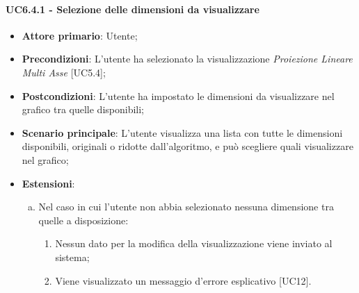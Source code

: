 \paragraph{UC6.4.1 - Selezione delle dimensioni da visualizzare}
\begin{itemize}
	\item \textbf{Attore primario}: Utente;
	\item \textbf{Precondizioni}: L'utente ha selezionato la visualizzazione \textit{Proiezione Lineare Multi Asse} [UC5.4];
	\item \textbf{Postcondizioni}: L'utente ha impostato le dimensioni da visualizzare nel grafico tra quelle disponibili;
	
	\item \textbf{Scenario principale}: L'utente visualizza una lista con tutte le dimensioni disponibili, originali o ridotte dall'algoritmo, e può scegliere quali visualizzare nel grafico;
	
	\item \textbf{Estensioni}:
	\begin{enumerate}[(a)]
		\item Nel caso in cui l'utente non abbia selezionato nessuna dimensione tra quelle a disposizione:
		\begin{enumerate}[1.]
			\item Nessun dato per la modifica della visualizzazione viene inviato al sistema;
			\item Viene visualizzato un messaggio d'errore esplicativo [UC12].
		\end{enumerate}
	\end{enumerate}
\end{itemize}